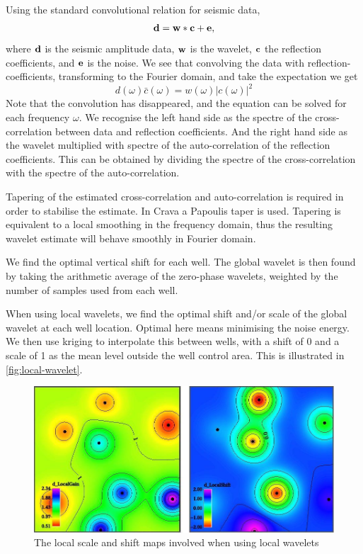 Using the standard convolutional relation for seismic data,
\begin{equation}
\mathbf{d} = \mathbf{w}*\mathbf{c}+\mathbf{e}, \label{fig:syntseis}
\end{equation}
where $\mathbf{d}$ is the seismic amplitude data, $\mathbf{w}$ is the
wavelet, $\mathbf{c}$ the reflection coefficients, and $\mathbf{e}$ is the
noise. We see that convolving the data with reflection-coefficients, 
transforming to the  Fourier domain, and take the expectation we get
\begin{equation}
d(\omega)\bar{c}(\omega) = w(\omega)|c(\omega)|^2
\end{equation}
Note that the convolution has disappeared, and the equation can be
solved for each frequency $\omega$. We recognise the left hand side as the 
spectre of the cross-correlation between data
and reflection coefficients. And the right hand side as the wavelet multiplied with 
spectre of the auto-correlation of the reflection coefficients. 
This can be obtained by dividing the spectre of the cross-correlation with the 
spectre of the auto-correlation. 

Tapering of the estimated cross-correlation and auto-correlation is required in order to stabilise the estimate. In Crava a Papoulis taper is used. Tapering is equivalent 
to a local smoothing in the frequency domain, thus the resulting wavelet 
estimate will behave smoothly in Fourier domain. 


We find the optimal vertical shift for each well. The global wavelet
is then found by taking the arithmetic average of the zero-phase
wavelets, weighted by the number of samples used from each well.

When using local wavelets, we find the optimal shift and/or scale of
the global wavelet at each well location. Optimal here means
minimising the noise energy. We then use kriging to interpolate this
between wells, with a shift of 0 and a scale of 1 as the mean level
outside the well control area.  This is illustrated in
\autoref{fig:local-wavelet}.

\begin{figure}
  \centering
  \includegraphics[width=.95\linewidth]{images/local-wavelet}
  \caption{The local scale and shift maps involved when using local wavelets}
  \label{fig:local-wavelet}
\end{figure}

